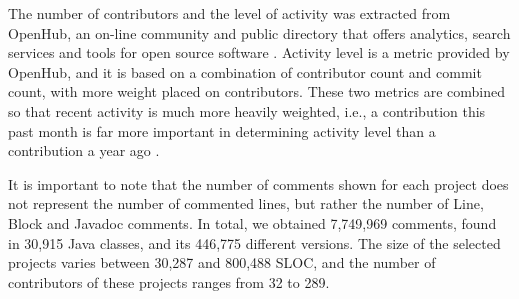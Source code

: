 The number of contributors and the level of activity was extracted from OpenHub, an on-line community and public directory that offers analytics, search services and tools for open source software \cite{Openhub:home}. Activity level is a metric provided by OpenHub, and it is based on a combination of contributor count and commit count, with more weight placed on contributors. These two metrics are combined so that recent activity is much more heavily weighted, i.e., a contribution this past month is far more important in determining activity level than a contribution a year ago \cite{Openhub:activity_level}. 

It is important to note that the number of comments shown for each project does not represent the number of commented lines, but rather the number of Line, Block and Javadoc comments. In total, we obtained 7,749,969 comments, found in 30,915 Java classes, and its 446,775 different versions. The size of the selected projects varies between 30,287 and 800,488 SLOC, and the number of contributors of these projects ranges from 32 to 289. 

